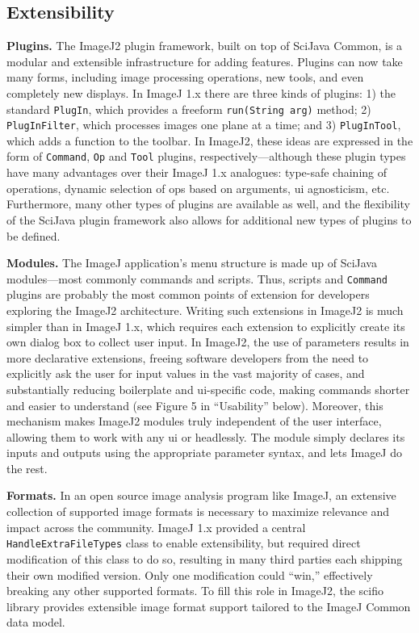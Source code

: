 \documentclass{bmcart}
\begin{document}
\subsection*{Extensibility}

\textbf{Plugins.} The ImageJ2 plugin framework, built on top of SciJava Common,
is a modular and extensible infrastructure for adding features. Plugins can now
take many forms, including image processing operations, new tools, and even
completely new displays. In ImageJ 1.x there are three kinds of plugins: 1) the
standard \texttt{PlugIn}, which provides a freeform \texttt{run(String arg)}
method; 2) \texttt{PlugInFilter}, which processes images one plane at a time;
and 3) \texttt{PlugInTool}, which adds a function to the toolbar. In ImageJ2,
these ideas are expressed in the form of \texttt{Command}, \texttt{Op} and
\texttt{Tool} plugins, respectively---although these plugin types have many
advantages over their ImageJ 1.x analogues: type-safe chaining of operations,
dynamic selection of ops based on arguments, \acrshort{ui} agnosticism, etc.
Furthermore, many other types of plugins are available as well, and the
flexibility of the SciJava plugin framework also allows for additional new
types of plugins to be defined.

\textbf{Modules.} The ImageJ application's menu structure is made up of SciJava
modules---most commonly commands and scripts. Thus, scripts and
\texttt{Command} plugins are probably the most common points of extension for
developers exploring the ImageJ2 architecture. Writing such extensions in
ImageJ2 is much simpler than in ImageJ 1.x, which requires each extension to
explicitly create its own dialog box to collect user input. In ImageJ2, the use
of parameters results in more declarative extensions, freeing software
developers from the need to explicitly ask the user for input values in the
vast majority of cases, and substantially reducing boilerplate and
\acrshort{ui}-specific code, making commands shorter and easier to understand
(see Figure 5 in ``Usability'' below). Moreover, this mechanism makes ImageJ2
modules truly independent of the user interface, allowing them to work with any
\acrshort{ui} or headlessly. The module simply declares its inputs and outputs
using the appropriate parameter syntax, and lets ImageJ do the rest.

\textbf{Formats.} In an open source image analysis program like ImageJ, an
extensive collection of supported image formats is necessary to maximize
relevance and impact across the community. ImageJ 1.x provided a central
\texttt{HandleExtraFileTypes} class to enable extensibility, but required
direct modification of this class to do so, resulting in many third parties
each shipping their own modified version. Only one modification could ``win,''
effectively breaking any other supported formats. To fill this role in ImageJ2,
the \acrshort{scifio} library provides extensible image format support tailored
to the ImageJ Common data model.
\end{document}
